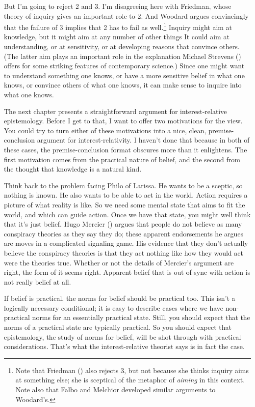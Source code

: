 \documentclass[
  10pt,
  letterpaper,
  twoside]{scrbook}
\begin{document}
But I'm going to reject 2 and 3. I'm disagreeing here with Friedman,
whose theory of inquiry gives an important role to 2. And Woodard argues
convincingly that the failure of 3 implies that 2 has to fail as
well.\footnote{Note that Friedman ()
  also rejects 3, but not because she thinks inquiry aims at something
  else; she is sceptical of the metaphor of \emph{aiming} in this
  context. Note also that Falbo and Melchior developed similar arguments
  to Woodard's.} Inquiry might aim at knowledge, but it might aim at any
number of other things It could aim at understanding, or at sensitivity,
or at developing reasons that convince others. (The latter aim plays an
important role in the explanation Michael Strevens
() offers for some striking features of
contemporary science.) Since one might want to understand something one
knows, or have a more sensitive belief in what one knows, or convince
others of what one knows, it can make sense to inquire into what one
knows.

The next chapter presents a straightforward argument for
interest-relative epistemology. Before I get to that, I want to offer
two motivations for the view. You could try to turn either of these
motivations into a nice, clean, premise-conclusion argument for
interest-relativity. I haven't done that because in both of these cases,
the premise-conclusion format obscures more than it enlightens. The
first motivation comes from the practical nature of belief, and the
second from the thought that knowledge is a natural kind.

Think back to the problem facing Philo of Larissa. He wants to be a
sceptic, so nothing is known. He also wants to be able to act in the
world. Action requires a picture of what reality is like. So we need
some mental state that aims to fit the world, and which can guide
action. Once we have that state, you might well think that it's just
belief. Hugo Mercier () argues that
people do not believe as many conspiracy theories as they say they do;
these apparent endorsements he argues are moves in a complicated
signaling game. His evidence that they don't actually believe the
conspiracy theories is that they act nothing like how they would act
were the theories true. Whether or not the details of Mercier's argument
are right, the form of it seems right. Apparent belief that is out of
sync with action is not really belief at all.

If belief is practical, the norms for belief should be practical too.
This isn't a logically necessary conditional; it is easy to describe
cases where we have non-practical norms for an essentially practical
state. Still, you should expect that the norms of a practical state are
typically practical. So you should expect that epistemology, the study
of norms for belief, will be shot through with practical considerations.
That's what the interest-relative theorist says is in fact the case.
\end{document}
